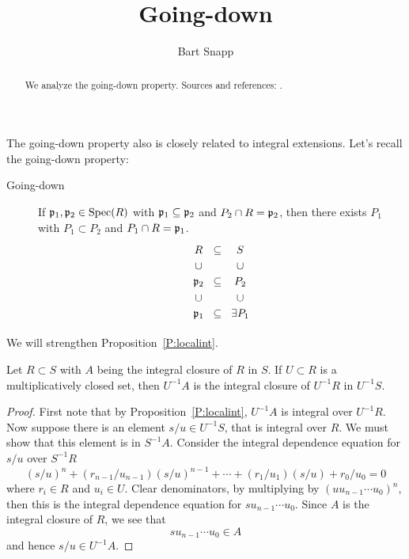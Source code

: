 \documentclass{ximera}
\author{Bart Snapp}
\title{Going-down}
\begin{document}
\begin{abstract}
  We analyze the going-down property. Sources and references:
  \cite{AM1969}.
\end{abstract}
\maketitle

The going-down property also is closely related to integral
extensions. Let's recall the going-down property:
\begin{description}
\item[Going-down] If $\mathfrak{p}_1,\mathfrak{p}_2\in\operatorname{Spec}(R)$ with $\mathfrak{p}_1\subseteq\mathfrak{p}_2$ and
  $P_2\cap R = \mathfrak{p}_2$, then there exists $P_1$ with $P_1\subset P_2$
  and $P_1\cap R = \mathfrak{p}_1$.
  \[
  \begin{tikzcd}[row sep=0em,column sep=0em]
    R    & \subset & S \\
    \cup &         & \cup \\
    \p_2 & \subset & P_2 \\
    \cup &         & \cup \\
    \p_1 & \subset & \exists P_1  
  \end{tikzcd}
  \]
\end{description}


We will strengthen Proposition~\ref{P:localint}.


\begin{proposition}\label{P:localintS}
  Let $R\subset S$ with $A$ being the integral closure of $R$
  in $S$. If $U\subset R$ is a multiplicatively closed set, then
  $U^{-1}A$ is the integral closure of $U^{-1}R$ in $U^{-1}S$.
  \begin{proof}
    First note that by Proposition~\ref{P:localint}, $U^{-1} A$ is
    integral over $U^{-1} R$. Now suppose there is an element $s/u\in
    U^{-1} S$, that is integral over $R$.  We must show that this
    element is in $S^{-1} A$. Consider the integral dependence
    equation for $s/u$ over $S^{-1} R$
    \[
    (s/u)^{n} + \left(r_{n-1}/u_{n-1}\right)(s/u)^{n-1}+\cdots +  \left(r_{1}/u_{1}\right)(s/u) + r_{0}/u_{0} = 0
    \]
    where $r_i\in R$ and $u_i\in U$. Clear denominators, by
    multiplying by $(uu_{n-1}\cdots u_0)^n$, then this is the integral
    dependence equation for $su_{n-1}\cdots u_0$. Since $A$ is the
    integral closure of $R$, we see that
    \[
    su_{n-1}\cdots u_0\in A
    \]
    and hence $s/u\in U^{-1} A$.
  \end{proof}
\end{proposition}
\end{document}
